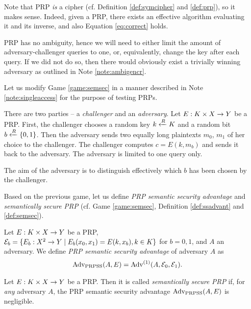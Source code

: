 Note that PRP {\em is} a cipher (cf. Definition \ref{def:symcipher} and \ref{def:prp}), so it makes sense. Indeed, given a PRP, there exists an effective algorithm evaluating it and its inverse, and also Equation \ref{eq:correct} holds.

\begin{note}   %
\label{note:singleaccess}
	PRP has no ambiguity, hence we will need to either limit the amount of adversary-challenger queries to one, or, equivalently, change the key after each query. If we did not do so, then there would obviously exist a trivially winning adversary as outlined in Note \ref{note:ambigencr}.
\end{note}

Let us modify Game \ref{game:semsec} in a manner described in Note \ref{note:singleaccess} for the purpose of testing PRPs.

\begin{game}
\label{game:semsecprp}
	There are two parties -- a {\em challenger} and an {\em adversary}. Let $E:K\times X\rightarrow Y$ be a PRP. First, the challenger chooses a random key $k\xleftarrow{R} K$ and a random bit $b\xleftarrow{R}\{0,1\}$. Then the adversary sends two equally long plaintexts $m_0$, $m_1$ of her choice to the challenger. The challenger computes $c = E(k,m_b)$ and sends it back to the adversary. The adversary is limited to one query only.
	
	The aim of the adversary is to distinguish effectively which $b$ has been chosen by the challenger.
\end{game}

Based on the previous game, let us define {\em PRP semantic security advantage} and {\em semantically secure PRP} (cf. Game \ref{game:semsec}, Definition \ref{def:ssadvant} and \ref{def:semsec}). %


\begin{defn}
\label{def:prpssadvant}
	Let $E: K\times X\rightarrow Y$ be a PRP, ${\cal E}_b = \{E_b:X^2\rightarrow Y \mid E_b(x_0,x_1) = E(k,x_b), k\in K\}$ for $b=0,1$, and $A$ an adversary. We define {\em PRP semantic security advantage} of adversary $A$ as
	\[
		\operatorname*{Adv_{PRPSS}}(A,E) = {\operatorname*{Adv}}^{(1)}(A,{\cal E}_0,{\cal E}_1) .
	\]
\end{defn}

\begin{defn}
\label{def:semsecprp}
	Let $E: K\times X\rightarrow Y$ be a PRP. Then it is called {\em semantically secure PRP} if, for {\em any} adversary $A$, the PRP semantic security advantage $\operatorname*{Adv_{PRPSS}}(A,E)$ is negligible.
\end{defn}


